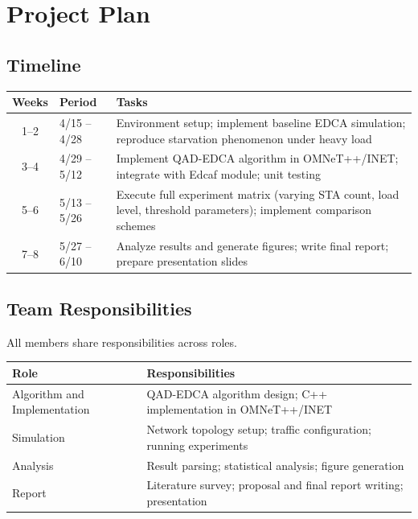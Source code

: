 \documentclass[12pt]{article}
\begin{document}
\section{Project Plan}

\subsection{Timeline}

\begin{table}[H]
\centering
\small
\renewcommand{\arraystretch}{1.2}
\begin{tabularx}{\textwidth}{c l X}
\toprule
\textbf{Weeks} & \textbf{Period} & \textbf{Tasks} \\
\midrule
1--2 & 4/15 -- 4/28
  & Environment setup; implement baseline EDCA simulation;
    reproduce starvation phenomenon under heavy load \\
3--4 & 4/29 -- 5/12
  & Implement QAD-EDCA algorithm in OMNeT++/INET;
    integrate with Edcaf module; unit testing \\
5--6 & 5/13 -- 5/26
  & Execute full experiment matrix (varying STA count,
    load level, threshold parameters); implement
    comparison schemes \\
7--8 & 5/27 -- 6/10
  & Analyze results and generate figures; write final
    report; prepare presentation slides \\
\bottomrule
\end{tabularx}
\end{table}

\subsection{Team Responsibilities}

All members share responsibilities across roles.

\vspace{0.5em}
\noindent
\begin{tabular}{@{} p{4cm} p{11.5cm} @{}}
\toprule
\textbf{Role} & \textbf{Responsibilities} \\
\midrule
Algorithm and Implementation
  & QAD-EDCA algorithm design;
    C++ implementation in OMNeT++/INET \\[0.3em]
Simulation
  & Network topology setup; traffic configuration;
    running experiments \\[0.3em]
Analysis
  & Result parsing; statistical analysis;
    figure generation \\[0.3em]
Report
  & Literature survey; proposal and final report
    writing; presentation \\
\bottomrule
\end{tabular}
\end{document}

